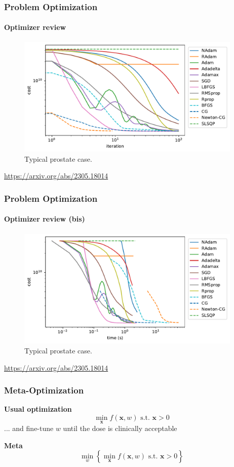 \documentclass{beamer}
\begin{document}
	\begin{frame}
		\frametitle{Problem Optimization}
		\framesubtitle{Optimizer review}
		
		\begin{figure}
			\includegraphics[width=10.75cm]{figures/ICMProstate-iter.pdf}
			\caption{Typical prostate case.}
		\end{figure}
		
		\url{https://arxiv.org/abs/2305.18014}
		
	\end{frame}
	
	\begin{frame}
		\frametitle{Problem Optimization}
		\framesubtitle{Optimizer review (bis)}
		
		\begin{figure}
			\includegraphics[width=10.75cm]{figures/ICMProstate-time.pdf}
			\caption{Typical prostate case.}
		\end{figure}
		
		\url{https://arxiv.org/abs/2305.18014}
	
	\end{frame}
	
	\begin{frame}
		\frametitle{Meta-Optimization}
		\textbf{Usual optimization}
		$$\min_{\textbf{x}} f(\textbf{x}, w) \text{ s.t. } \textbf{x} > 0$$
		... and fine-tune $w$ until the dose is clinically acceptable
		
		\textbf{Meta}
		$$\min_w \left\lbrace \min_{\textbf{x}} f(\textbf{x}, w) \text{ s.t. } \textbf{x} > 0 \right\rbrace $$
	\end{frame}
	
\end{document}
